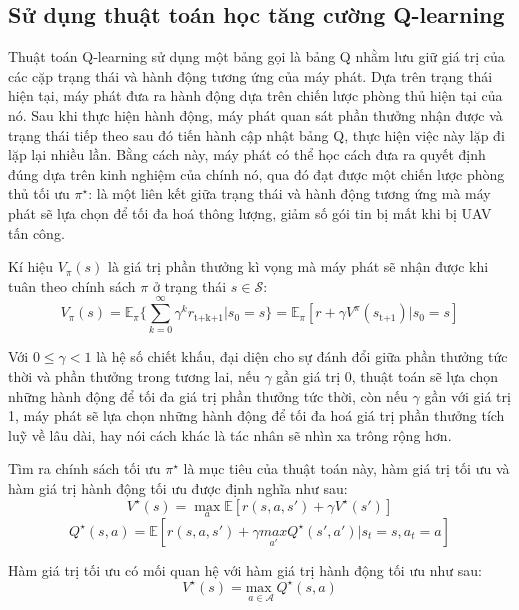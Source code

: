 \documentclass{uetgraduation}
\begin{document}
\subsection{Sử dụng thuật toán học tăng cường Q-learning}
Thuật toán Q-learning sử dụng một bảng gọi là bảng Q nhằm lưu giữ giá trị của các cặp trạng thái và hành động tương ứng của máy phát. Dựa trên trạng thái hiện tại, máy phát đưa ra hành động dựa trên
chiến lược phòng thủ hiện tại của nó. Sau khi thực hiện hành động, máy phát quan sát phần thưởng nhận được và trạng thái tiếp theo sau đó tiến hành cập nhật bảng Q, thực hiện việc này lặp đi lặp lại nhiều lần. 
Bằng cách này, máy phát có thể học cách đưa ra quyết định đúng dựa trên kinh nghiệm của chính nó, qua đó đạt được một chiến lược phòng thủ tối ưu $\pi^\star$: là một liên kết giữa trạng thái và hành động tương
ứng mà máy phát sẽ lựa chọn để tối đa hoá thông lượng, giảm số gói tin bị mất khi bị UAV tấn công.

Kí hiệu $V_\pi (s)$ là giá trị phần thưởng kì vọng mà máy phát sẽ nhận được khi tuân theo chính sách $\pi$ ở trạng thái $s \in \mathcal{S}$:
\begin{equation}
    V_\pi (s) = \mathbb{E}_\pi \{\sum_{k=0}^{\infty} \gamma^k r_\text{t+k+1} | s_0 = s\} = \mathbb{E}_\pi [r + \gamma V^\pi (s_\text{t+1}) | s_0 = s]
\end{equation}

Với $0 \leq \gamma < 1$ là hệ số chiết khấu, đại diện cho sự đánh đổi giữa phần thưởng tức thời và phần thưởng trong tương lai, nếu $\gamma$ gần giá trị 0, thuật toán sẽ lựa chọn những hành động để
tối đa giá trị phần thưởng tức thời, còn nếu $\gamma$ gần với giá trị 1, máy phát sẽ lựa chọn những hành động để tối đa hoá giá trị phần thưởng tích luỹ về lâu dài, hay nói cách khác là tác nhân sẽ nhìn xa
trông rộng hơn.

Tìm ra chính sách tối ưu $\pi^\star$ là mục tiêu của thuật toán này, hàm giá trị tối ưu và hàm giá trị hành động tối ưu được định nghĩa như sau:
\begin{equation}
    V^\star (s) = \underset{a}{\max} \mathbb{E} [r(s, a, s') + \gamma V^\star (s')]
\end{equation}
\begin{equation}
    Q^\star (s, a) = \mathbb{E} [r(s, a, s') + \gamma \underset{a'}{ max } Q^\star (s', a') | s_t = s, a_t = a]
\end{equation}

Hàm giá trị tối ưu có mối quan hệ với hàm giá trị hành động tối ưu như sau:
\begin{equation}
    V^\star (s) = \underset{a \in \mathcal{A}}{\text{max }} Q^\star (s, a)
\end{equation}
\end{document}
